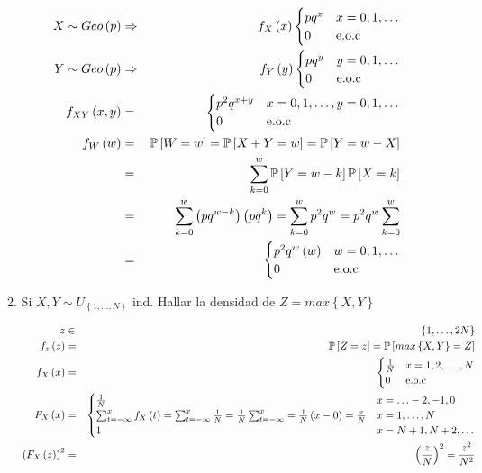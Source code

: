 \begin{enumerate}
\begin{enumerate}
\begin{eqnarray*}
X \sim Geo \left( p \right) &\Rightarrow& f_{X}\left(x \right) \begin{cases} pq^{x} & x= 0,1, \ldots\\
0 & \textrm{e.o.c}
\end{cases}\\
Y \sim Geo \left( p \right) &\Rightarrow& f_{Y}\left(y \right) \begin{cases} pq^{y} & y= 0,1, \ldots\\
0 & \textrm{e.o.c}
\end{cases}\\
 f_{XY}\left(x,y \right)&=& \begin{cases} p^{2}q^{x+y} & x= 0,1, \ldots, y=0,1, \ldots\\
0 & \textrm{e.o.c}
\end{cases}\\
f_{W} \left(w \right) &=& \mathbb{P} \left[W=w \right]= \mathbb{P} \left[X+Y=w \right]= \mathbb{P} \left[Y= w-X \right]\\
&=& \sum_{k=0}^{w} \mathbb{P} \left[Y= w-k \right] \mathbb{P} \left[X=k \right]\\
&=& \sum_{k=0}^{w} \left( pq^{w-k} \right) \left( pq^{k} \right)= \sum_{k=0}^{w} p^{2} q^{w} = p^{2}q^{w} \sum_{k=0}^{w} \\
&=& \begin{cases}p^{2} q^{w} \left( w \right) & w=0,1,\ldots\\
0 & \textrm{e.o.c}
\end{cases}
\end{eqnarray*}
\item  Si $X,Y \sim U_{ \left\{ 1, \ldots, N \right\} }$ ind. Hallar la densidad de $Z = max \left\{X,Y \right\} $

\begin{eqnarray*}
z &\in& \left\{ 1 , \ldots, 2N \right\} \\
f_{z} \left(z \right) &=& \mathbb{P} \left[Z = z \right] = \mathbb{P} \left[max \left\{ X,Y\right\} = Z \right]\\
f_{X} \left(x \right)&=& \begin{cases}
\frac{1}{N} & x=1,2, \ldots ,N\\
0 & \textrm{e.o.c}
\end{cases}\\
F_{X} \left(x \right)&=& \begin{cases}
\frac{1}{N} & x= \ldots -2, -1, 0\\
\sum_{t=- \infty }^{x} f_{X} \left(t \right)= \sum_{t=-\infty}^{x} \frac{1}{N}=\frac{1}{N} \sum_{t=-\infty}^{x} = \frac{1}{N} \left(x-0 \right) = \frac{x}{N} & x= 1, \ldots ,N\\
1 & x= N+1, N+2, \ldots
\end{cases}\\
\left(F_{X} \left(z \right) \right)^{2} &=& \left( \frac{z}{N} \right)^ {2} = \frac{z^2}{N^2}
\end{eqnarray*}


\end{enumerate}
\end{enumerate}
